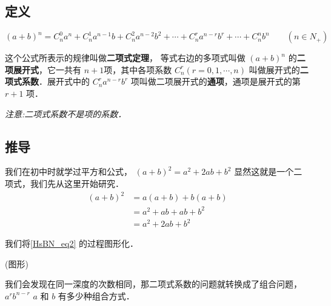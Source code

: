 
\begin{issues}
\issueDraft
\end{issues}
\subsection{定义}
\begin{equation}
(a + b)^n = C_n^0a^n + C_n^1a^{n- 1}b + C_n^2a^{n- 2}b^2 + \cdots + C_n^ra^{n-r}b^r + \cdots + C_n^nb^n \qquad (n\in N_{+})
\end{equation}

这个公式所表示的规律叫做\textbf{二项式定理}，
等式右边的多项式叫做 $(a+b)^n$ 的\textbf{二项展开式}，它一共有 $n+1$项，其中各项系数 $C_n^r(r = 0, 1, \cdots, n)$ 叫做展开式的\textbf{二项式系数}．展开式中的 $C_n^ra^{n-r}b^r$ 项叫做二项展开式的\textbf{通项}，通项是展开式的第 $r+1$ 项．

\textsl{注意:二项式系数不是项的系数．}

\subsection{推导}
我们在初中时就学过平方和公式， $(a+b)^2 = a^2 + 2ab + b^2$ 显然这就是一个二项式，我们先从这里开始研究．
\begin{equation}\label{HsBN_eq2}
\begin{aligned}
(a+b)^2 &= a(a + b) + b(a + b)\\
&= a^2 + ab + ab + b^2\\
&= a^2 + 2ab + b^2
\end{aligned}
\end{equation}

我们将\autoref{HsBN_eq2} 的过程图形化．

(图形)

我们会发现在同一深度的次数相同，那二项式系数的问题就转换成了组合问题， $a^rb^{n-r}$ $a$ 和 $b$ 有多少种组合方式．